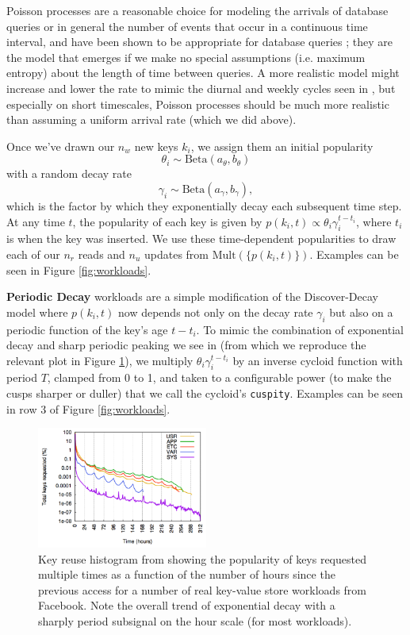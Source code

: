 \documentclass{sig-alternate-05-2015}
\begin{document}
Poisson processes are a reasonable choice for modeling the arrivals of database
queries or in general the number of events that occur in a continuous time
interval, and have been shown to be appropriate for database queries
\cite{poisson-db1,poisson-db2,poisson-db3}; they are the model that emerges
if we make no special assumptions (i.e. maximum entropy) about the
length of time between queries.  A more realistic model might increase and
lower the rate to mimic the diurnal and weekly cycles seen in
\cite{characterizing-memcached}, but especially on short timescales, Poisson
processes should be much more realistic than assuming a uniform arrival rate
(which we did above).

Once we've drawn our $n_w$ new keys $k_i$, we assign them an initial popularity
$$
\theta_{i} \sim \textrm{Beta}(a_\theta,b_\theta)
$$
\noindent with a random decay rate
$$
\gamma_i \sim \textrm{Beta}(a_\gamma,b_\gamma),
$$
which is the factor by which they exponentially decay each subsequent time
step. At any time $t$, the popularity of each key is given by $p(k_i,t) \propto
\theta_i\gamma_i^{t-t_i}$, where $t_i$ is when the key was inserted. We use
these time-dependent popularities to draw each of our $n_r$ reads and $n_u$
updates from $\textrm{Mult}(\{p(k_i,t)\})$. Examples can be seen in Figure
\ref{fig:workloads}.

\textbf{Periodic Decay} workloads are a simple modification of the
Discover-Decay model where $p(k_i,t)$ now depends not only on the decay rate
$\gamma_i$ but also on a periodic function of the key's age $t-t_i$.  To mimic
the combination of exponential decay and sharp periodic peaking we see in
\cite{characterizing-memcached} (from which we reproduce the relevant plot in
Figure \ref{fig:memcached-decay}), we multiply $\theta_i\gamma_i^{t-t_i}$ by an
inverse cycloid function with period $T$, clamped from 0 to 1, and taken to a
configurable power (to make the cusps sharper or duller) that we call the
cycloid's \texttt{cuspity}. Examples can be seen in row 3 of Figure
\ref{fig:workloads}.

\begin{figure}[!htb]
\begin{center}
\includegraphics[width=0.5\textwidth]{cuspity.png}
\end{center}
\caption{Key reuse histogram from \cite{characterizing-memcached} showing the
  popularity of keys requested multiple times as a function of the number of
  hours since the previous access for a number of real key-value store
  workloads from Facebook. Note the overall trend of exponential decay with a
  sharply period subsignal on the hour scale (for most workloads).}
\label{fig:memcached-decay}
\end{figure}
\end{document}
